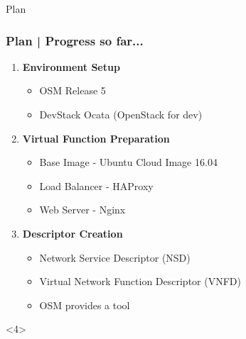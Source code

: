 \documentclass{beamer}
\begin{document}

\begin{frame}

\Huge{\centerline{Plan}}

\end{frame}


\begin{frame}
\frametitle{Plan | Progress so far...}


\begin{enumerate}
	\item \textbf{Environment Setup}\\
	\begin{itemize}
		\item OSM Release 5
		\item DevStack Ocata (OpenStack for dev)
	\end{itemize} \pause

	\item \textbf{Virtual Function Preparation}\\
	\begin{itemize}
		\item Base Image - Ubuntu Cloud Image 16.04
		\item Load Balancer - HAProxy
		\item Web Server - Nginx		
	\end{itemize} \pause

	\item \textbf{Descriptor Creation}\\
	\begin{itemize}
		\item Network Service Descriptor (NSD)
		\item Virtual Network Function Descriptor (VNFD)
		\item OSM provides a tool		
	\end{itemize} \pause
	
\end{enumerate}

\begin{onlyenv}<4>
	

\end{onlyenv}
\end{frame}
\end{document}
